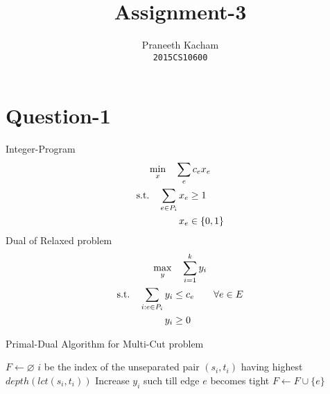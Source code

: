 \documentclass{article}
\title{Assignment-3}
\date{}
\author{Praneeth Kacham \\ \texttt{2015CS10600}}
\newcommand{\set}[1]{\{#1\}}
\begin{document}
\maketitle
\section*{Question-1}
Integer-Program
\begin{gather*}
    \min_{x}\quad \sum_{e}c_ex_e \\
    \begin{aligned}
    \textup{s.t.}\quad \sum_{e \in P_i}x_e  &\ge  1\\
                       x_e  &\in  \set{0,1} \\
    \end{aligned}
\end{gather*}
Dual of Relaxed problem
\begin{gather*}
    \max_{y}\quad \sum_{i=1}^ky_i \\
    \begin{aligned}
    \textup{s.t.}\quad \sum_{i : e \in P_i}y_i  &\le  c_e \qquad \forall e \in E\\
                       y_i  &\ge  0 \\
    \end{aligned}
\end{gather*}
\begin{algorithm}
    \caption{Primal-Dual Algorithm for Multi-Cut problem}
    \begin{algorithmic}
            \State $F \leftarrow \varnothing$
            \Comment{}
            \State $i$  be the index of the unseparated pair $(s_i,t_i)$ having highest $depth(lct(s_i,t_i))$
            \State Increase $y_i$ such till edge $e$ becomes tight
            \State $F \leftarrow F \cup \set{e}$
            \EndWhile
        \EndProcedure
    \end{algorithmic}
\end{algorithm}
\end{document}
